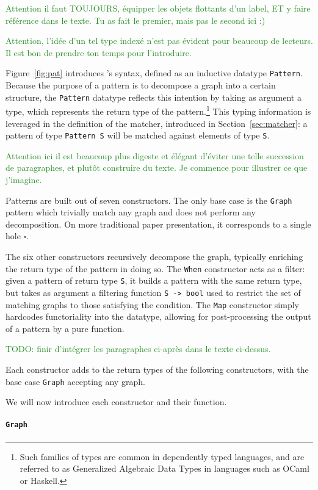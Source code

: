 \documentclass[11pt]{article}
\newcommand{\inlinecoq}[1]{\mbox{\lstinline[style=customcoq,columns=fixed,basewidth=.48em]{#1}}}
\newcommand{\ilc}[1]{\inlinecoq{#1}}
\newcommand{\yz}[1]{\textcolor{ForestGreen}{#1}}
\newcommand{\yzt}[1]{\textcolor{ForestGreen!50}{#1}}
\begin{document}
\yz{Attention il faut TOUJOURS, équipper les objets flottants d'un label, ET y faire référence dans le texte. Tu as fait le premier, mais pas le second ici :)}

\yz{Attention, l'idée d'un tel type indexé n'est pas évident pour beaucoup de lecteurs. Il est bon de prendre ton temps pour l'introduire.}

Figure~\ref{fig:pat} introduces \pat{}'s syntax, defined as an inductive datatype \ilc{Pattern}.
Because the purpose of a pattern is to decompose a graph into a certain structure, the \ilc{Pattern} datatype reflects this intention by taking as argument a type, which represents the return type of the pattern.\footnote{Such families of types are common in dependently typed languages, and are referred to as Generalized Algebraic Data Types in languages such as OCaml or Haskell.}
This typing information is leveraged in the definition of the matcher, introduced in Section~\ref{sec:matcher}: a pattern of type \ilc{Pattern S} will be matched against elements of type \ilc{S}.

\yz{Attention ici il est beaucoup plus digeste et élégant d'éviter une telle succession de paragraphes, et plutôt construire du texte. Je commence pour illustrer ce que j'imagine.}

\yzt{Patterns are built out of seven constructors. The only base case is the \ilc{Graph} pattern which trivially match any graph and does not perform any decomposition. On more traditional paper presentation, it corresponds to a single hole $\square$.}

\yzt{The six other constructors recursively decompose the graph, typically enriching the return type of the pattern in doing so. 
The \ilc{When} constructor acts as a filter:
given a pattern of return type \ilc{S}, it builds a pattern with the same return type, but takes as argument a filtering function \ilc{S -> bool} used to restrict the set of matching graphs to those satisfying the condition.
The \ilc{Map} constructor simply hardcodes functoriality into the datatype, allowing for post-processing the output of a pattern by a pure function.
}

\yz{TODO: finir d'intégrer les paragraphes ci-après dans le texte ci-dessus.}


Each constructor adds to the return types of the following constructors, with the base case \ilc{Graph} accepting any graph.

We will now introduce each constructor and their function.

\paragraph{\ilc{Graph}}
\end{document}
